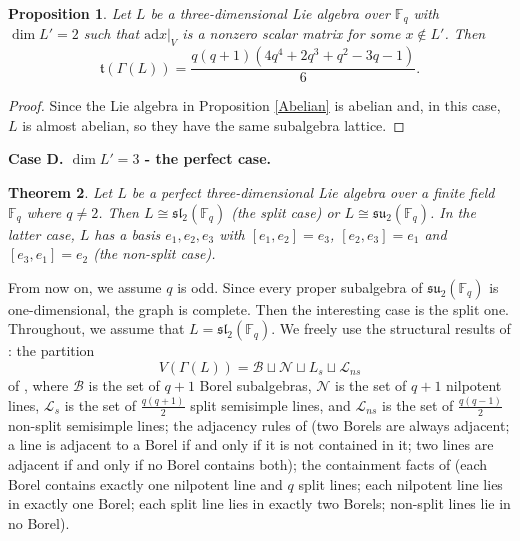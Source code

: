 \documentclass[11pt]{amsart}
\theoremstyle{plain}
\newtheorem{theorem}{Theorem}[section]
\newtheorem{proposition}[theorem]{Proposition}
\def\F{\mathbb{F}}
\def\ad{\mathrm{ad}}
\begin{document}
 
\begin{proposition}\label{CaseC4}
Let $L$ be a three-dimensional Lie algebra over $\F_q$ with $\dim L'=2$ such that
$\ad x |_V$ is a nonzero scalar matrix for some $x\notin L'$. Then 
\[\mathfrak{t}(\Gamma(L)) = \frac{q(q+1)(4q^4+2q^3+q^2-3q-1)}{6}.\] %
\end{proposition}

\begin{proof}
Since the Lie algebra in Proposition \ref{Abelian} is abelian and, in this case, $L$ is almost abelian, so they have the same subalgebra lattice. 

\end{proof}
 

 
\textbf{Case D. $\dim L'=3$ - the perfect case.}

\begin{theorem} \cite[Theorem 4.9]{TZG}
Let $L$ be a perfect three-dimensional Lie algebra over a finite field $\F_q$ where $q\neq 2$. Then $L\cong \mathfrak{sl}_2(\F_q)$ (the split case) or $L\cong \mathfrak{su}_2(\F_q)$. In the latter case, $L$ has a basis $e_1,e_2,e_3$ with $[e_1,e_2]=e_3$, $[e_2,e_3]=e_1$ and $[e_3,e_1]=e_2$ (the non-split case).
\end{theorem}


From now on, we assume $q$ is odd. Since every proper subalgebra of $\mathfrak{su}_2(\F_q)$ is one-dimensional, the graph is complete. Then the interesting case is the split one. Throughout, we assume that $L=\mathfrak{sl}_2(\F_q)$.  We freely use the structural results of \cite{TZG}: the partition
\[V(\Gamma(L)) = \mathcal{B}\sqcup \mathcal{N}\sqcup L_s \sqcup \mathcal{L}_{ns}\]
of \cite[Proposition 4.10]{TZG}, where $\mathcal{B}$ is the set of $q+1$ Borel subalgebras, $\mathcal{N}$ is the set of $q+1$ nilpotent lines, $\mathcal{L}_s$ is the set of $\tfrac{q(q+1)}{2}$ split semisimple lines, and $\mathcal{L}_{ns}$ is the set of $\frac{q(q-1)}{2}$ non-split semisimple lines; the adjacency rules of \cite[Proposition 4.11]{TZG} (two Borels are always adjacent; a line is adjacent to a Borel if and only if it is not contained in it; two lines are adjacent if and only if no Borel contains both); the containment facts of \cite[Lemma 4.14]{TZG} (each Borel contains exactly one nilpotent line and $q$ split lines; each nilpotent line lies in exactly one Borel; each split line lies in exactly two Borels; non-split lines lie in no Borel).  
\end{document}
